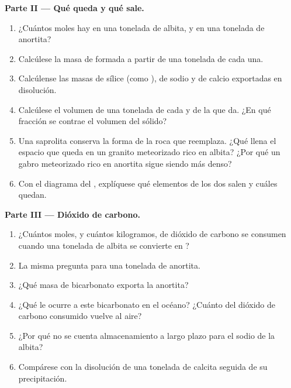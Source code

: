 \begin{problem}
\medskip
\noindent\textbf{Parte II --- Qué queda y qué sale.}
\begin{enumerate}[resume]
  \item ¿Cuántos moles hay en una tonelada de albita, y en una tonelada de anortita?
  \item Calcúlese la masa de  formada a partir de una tonelada de cada una.
  \item Calcúlense las masas de sílice (como ), de sodio y de calcio exportadas en disolución.
  \item Calcúlese el volumen de una tonelada de cada  y de la  que da. ¿En qué fracción se contrae el volumen del sólido?
  \item Una saprolita conserva la forma de la roca que reemplaza. ¿Qué llena el espacio que queda en un granito meteorizado rico en albita?
        ¿Por qué un gabro meteorizado rico en anortita sigue siendo más denso?
  \item Con el diagrama del , explíquese qué elementos de los dos  salen y cuáles quedan.
\end{enumerate}

\medskip
\noindent\textbf{Parte III --- Dióxido de carbono.}
\begin{enumerate}[resume]
  \item ¿Cuántos moles, y cuántos kilogramos, de dióxido de carbono se consumen cuando una tonelada de albita se convierte en ?
  \item La misma pregunta para una tonelada de anortita.
  \item ¿Qué masa de bicarbonato exporta la anortita?
  \item ¿Qué le ocurre a este bicarbonato en el océano? ¿Cuánto del dióxido de carbono consumido vuelve al aire?
  \item ¿Por qué no se cuenta almacenamiento a largo plazo para el sodio de la albita?
  \item Compárese con la disolución de una tonelada de calcita seguida de su precipitación.
\end{enumerate}


\end{problem}
